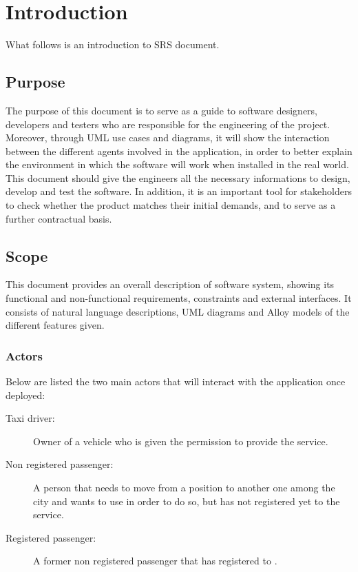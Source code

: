 \section{Introduction}      %
What follows is an introduction to \myTaxiService{} SRS document.
\subsection{Purpose}
The purpose of this document is to serve as a guide to software designers, developers and testers who are responsible for the engineering of the \myTaxiService{} project.
Moreover, through UML use cases and diagrams, it will show the interaction between the different agents involved in the application, in order to better explain the environment in which the software will work when installed in the real world.
This document should give the engineers all the necessary informations to design, develop and test the software.
In addition, it is an important tool for stakeholders to check whether the product matches their initial demands, and to serve as a further contractual basis.
\subsection{Scope}
This document provides an overall description of \myTaxiService{} software system, showing its functional and non-functional requirements, constraints and external interfaces.
It consists of natural language descriptions, UML diagrams and Alloy models of the different features given.
\subsubsection{Actors}
Below are listed the two main actors that will interact with the application once deployed:
\begin{description}
	\item[Taxi driver:]	Owner of a vehicle who is given the permission to provide the service.
	\item[Non registered passenger:] A person that needs to move from a position to another one among the city and wants to use \myTaxiService{} in order to do so, but has not registered yet to the service.
	\item[Registered passenger:] A former non registered passenger that has registered to \myTaxiService{}.
\end{description}
